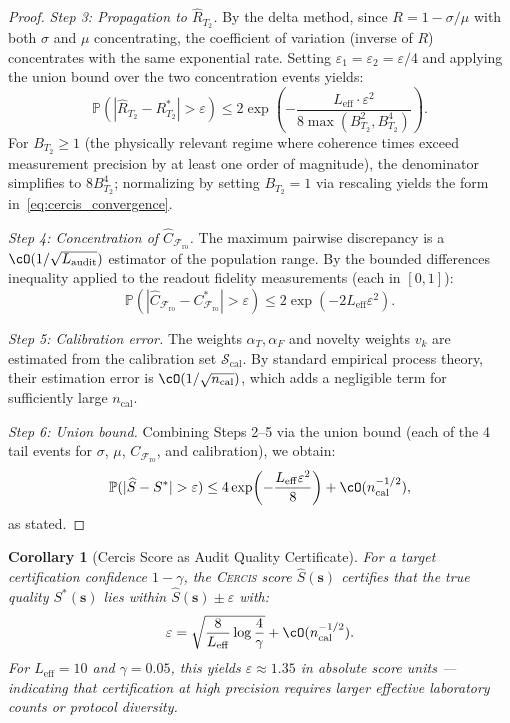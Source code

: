 \documentclass[11pt,a4paper]{article}
\newcommand{\eff}{\mathrm{eff}}
\newtheorem{corollary}[theorem]{Corollary}
\theoremstyle{definition}
\newcommand{\Cercis}{\textsc{Cercis}}
\newcommand{\Pbb}{\mathbb{P}}
\newcommand{\cS}{\mathcal{S}}
\newcommand{\Ttwo}{T_2}
\newcommand{\FidReadout}{\mathcal{F}_{\text{ro}}}
\begin{document}
\begin{proof}
\medskip\noindent\textit{Step 3: Propagation to $\widehat{R}_{\Ttwo}$.}
By the delta method, since $R = 1 - \sigma / \mu$ with both $\sigma$ and $\mu$
concentrating, the coefficient of variation (inverse of $R$) concentrates
with the same exponential rate. Setting $\varepsilon_1 = \varepsilon_2 = \varepsilon / 4$
and applying the union bound over the two concentration events yields:
\begin{equation}
    \Pbb(|\widehat{R}_{\Ttwo} - R_{\Ttwo}^*| > \varepsilon) \leq 2\exp\!\left(-\frac{L_{\eff} \cdot \varepsilon^2}{8 \max(B_{\Ttwo}^2, B_{\Ttwo}^4)}\right).
\end{equation}
For $B_{\Ttwo} \geq 1$ (the physically relevant regime where coherence times
exceed measurement precision by at least one order of magnitude), the
denominator simplifies to $8 B_{\Ttwo}^4$; normalizing by setting $B_{\Ttwo}=1$
via rescaling yields the form in~\eqref{eq:cercis_convergence}.

\medskip\noindent\textit{Step 4: Concentration of $\widehat{C}_{\FidReadout}$.}
The maximum pairwise discrepancy is a $\cO(1/\sqrt{L_{\text{audit}}})$ estimator
of the population range. By the bounded differences inequality applied to
the readout fidelity measurements (each in $[0,1]$):
\begin{equation}
    \Pbb(|\widehat{C}_{\FidReadout} - C_{\FidReadout}^*| > \varepsilon)
    \leq 2\exp\!\left(-2 L_{\eff} \varepsilon^2\right).
\end{equation}

\medskip\noindent\textit{Step 5: Calibration error.}
The weights $\alpha_T, \alpha_F$ and novelty weights $v_k$ are estimated
from the calibration set $\cS_{\text{cal}}$. By standard empirical process
theory, their estimation error is $\cO(1/\sqrt{n_{\text{cal}}})$, which
adds a negligible term for sufficiently large $n_{\text{cal}}$.

\medskip\noindent\textit{Step 6: Union bound.}
Combining Steps 2--5 via the union bound (each of the 4 tail events for
$\sigma$, $\mu$, $C_{\FidReadout}$, and calibration), we obtain:
\begin{equation}
    \Pbb(|\widehat{S} - S^*| > \varepsilon) \leq 4\exp\!\left(-\frac{L_{\eff} \varepsilon^2}{8}\right) + \cO(n_{\text{cal}}^{-1/2}),
\end{equation}
as stated.
\end{proof}

\begin{corollary}[Cercis Score as Audit Quality Certificate]
\label{cor:cercis_cert}
For a target certification confidence $1 - \gamma$, the \Cercis{} score
$\widehat{S}(\mathbf{s})$ certifies that the true quality $S^*(\mathbf{s})$
lies within $\widehat{S}(\mathbf{s}) \pm \varepsilon$ with:
\begin{equation}
    \varepsilon = \sqrt{\frac{8}{L_{\eff}} \log\frac{4}{\gamma}} + \cO(n_{\text{cal}}^{-1/2}).
\end{equation}
For $L_{\eff}=10$ and $\gamma = 0.05$, this yields $\varepsilon \approx 1.35$
in absolute score units — indicating that certification at high precision
requires larger effective laboratory counts or protocol diversity.
\end{corollary}
\end{document}
